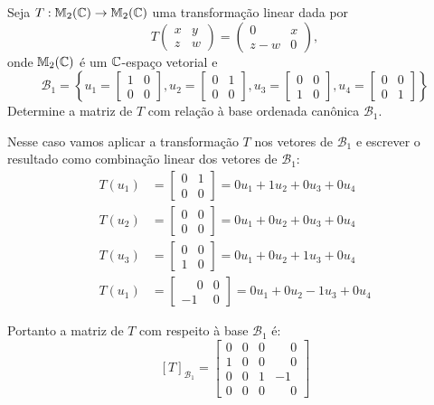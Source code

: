 \documentclass[12pt]{exam}
\begin{document}
    \vspace*{2cm}

    \questao{}  Seja $T : \mathbb{M}_2(\mathbb{C}) \to \mathbb{M}_2(\mathbb{C})$ uma transformação linear dada por
    \[
    T \begin{pmatrix}
        x & y\\
        z & w
    \end{pmatrix} = \begin{pmatrix}
        0 & x\\
        z - w & 0
    \end{pmatrix},
    \]
    onde $\mathbb{M}_2(\mathbb{C})$ é um $\mathbb{C}$-espaço vetorial
    e
    \[
    \mathcal{B}_1 = \left\{u_1 = \begin{bmatrix}
        1 & 0\\0 & 0
    \end{bmatrix}, u_2 = \begin{bmatrix}
        0 & 1\\0 & 0
    \end{bmatrix}, u_3 = \begin{bmatrix}
        0 & 0\\1 & 0
    \end{bmatrix}, u_4 = \begin{bmatrix}
        0 & 0\\0 & 1
    \end{bmatrix}\right\}
    \]
    Determine a matriz de $T$ com relação à base ordenada canônica $\mathcal{B}_1$.

    \vspace*{.5cm}

    \solucao Nesse caso vamos aplicar a transformação $T$ nos vetores de $\mathcal{B}_1$ e escrever o resultado como combinação linear
    dos vetores de $\mathcal{B}_1$:
    \begin{align*}
        T(u_1) &= \begin{bmatrix}0 & 1\\ 0 & 0\end{bmatrix} = 0u_1 + 1u_2 + 0u_3 + 0u_4\\
        T(u_2) &= \begin{bmatrix}0 & 0\\ 0 & 0\end{bmatrix} = 0u_1 + 0u_2 + 0u_3 + 0u_4\\
        T(u_3) &= \begin{bmatrix}0 & 0\\ 1 & 0\end{bmatrix} = 0u_1 + 0u_2 + 1u_3 + 0u_4\\
        T(u_1) &= \begin{bmatrix}\phantom{-}0 & 0\\ -1 & 0\end{bmatrix} = 0u_1 + 0u_2 - 1u_3 + 0u_4
    \end{align*}

    Portanto a matriz de $T$ com respeito à base $\mathcal{B}_1$ é:
    \[
        [T]_{\mathcal{B}_1} = \begin{bmatrix}0 & 0 & 0 & \phantom{-}0\\1 & 0 & 0 & \phantom{-}0\\0 & 0 & 1 & -1\\0 & 0 & 0 & \phantom{-}0\end{bmatrix}
    \]
\end{document}
